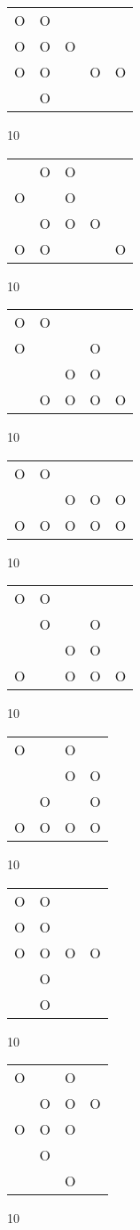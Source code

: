 \begin{tabular}{|m{0.2cm}m{0.2cm}m{0.2cm}m{0.2cm}m{0.2cm}|}\hline
O&O& & & \\
O&O&O& & \\
O&O& &O&O\\
 &O& & & \\
\hline\end{tabular}10
\begin{tabular}{|m{0.2cm}m{0.2cm}m{0.2cm}m{0.2cm}m{0.2cm}|}\hline
 &O&O& & \\
O& &O& & \\
 &O&O&O& \\
O&O& & &O\\
\hline\end{tabular}10
\begin{tabular}{|m{0.2cm}m{0.2cm}m{0.2cm}m{0.2cm}m{0.2cm}|}\hline
O&O& & & \\
O& & &O& \\
 & &O&O& \\
 &O&O&O&O\\
\hline\end{tabular}10
\begin{tabular}{|m{0.2cm}m{0.2cm}m{0.2cm}m{0.2cm}m{0.2cm}|}\hline
O&O& & & \\
 & &O&O&O\\
O&O&O&O&O\\
\hline\end{tabular}10
\begin{tabular}{|m{0.2cm}m{0.2cm}m{0.2cm}m{0.2cm}m{0.2cm}|}\hline
O&O& & & \\
 &O& &O& \\
 & &O&O& \\
O& &O&O&O\\
\hline\end{tabular}10
\begin{tabular}{|m{0.2cm}m{0.2cm}m{0.2cm}m{0.2cm}|}\hline
O& &O& \\
 & &O&O\\
 &O& &O\\
O&O&O&O\\
\hline\end{tabular}10
\begin{tabular}{|m{0.2cm}m{0.2cm}m{0.2cm}m{0.2cm}|}\hline
O&O& & \\
O&O& & \\
O&O&O&O\\
 &O& & \\
 &O& & \\
\hline\end{tabular}10
\begin{tabular}{|m{0.2cm}m{0.2cm}m{0.2cm}m{0.2cm}|}\hline
O& &O& \\
 &O&O&O\\
O&O&O& \\
 &O& & \\
 & &O& \\
\hline\end{tabular}10
